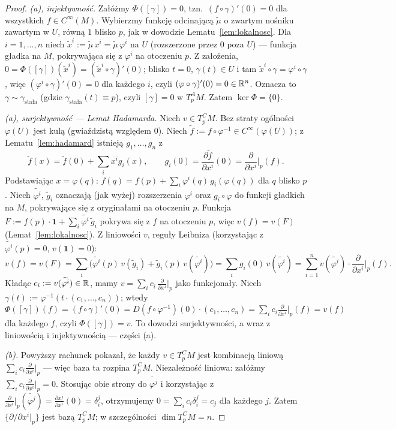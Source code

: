 \begin{proof}
\emph{(a), injektywność.} Załóżmy $\Phi([\gamma])=0$, tzn.\ $(f\circ\gamma)'(0)=0$ dla
wszystkich $f\in C^\infty(M)$. Wybierzmy funkcję odcinającą
$\tilde\mu$ o zwartym nośniku zawartym w $U$, równą $1$ blisko $p$,
jak w dowodzie Lematu~\ref{lem:lokalnosc}.
Dla $i=1,\dots,n$ niech $\tilde x^i:=\tilde\mu\,x^i
=\tilde\mu\,\varphi^i$ na $U$ (rozszerzone przez $0$ poza $U$) —
funkcja gładka na $M$, pokrywająca się z $\varphi^i$ na otoczeniu $p$. Z założenia,
$0=\Phi([\gamma])(\tilde x^i)=(\tilde x^i\circ\gamma)'(0)$; blisko $t=0$, $\gamma(t)\in U$
i tam $\tilde x^i\circ\gamma=\varphi^i\circ\gamma$, więc $(\varphi^i\circ\gamma)'(0)=0$ dla
każdego $i$, czyli $(\varphi\circ\gamma)'(0)=0\in\mathbb{R}^n$. Oznacza to $\gamma\sim
\gamma_{\text{stała}}$ (gdzie $\gamma_{\text{stała}}(t)\equiv p$), czyli $[\gamma]=0$ w
$T_p^AM$. Zatem $\ker\Phi=\{0\}$.

\emph{(a), surjektywność — Lemat Hadamarda.} Niech $v\in T_p^CM$. Bez straty ogólności
$\varphi(U)$ jest kulą (gwiaździstą względem $0$). Niech $\tilde f:=f\circ\varphi^{-1}\in
C^\infty(\varphi(U))$; z Lematu~\ref{lem:hadamard} istnieją $g_1,\dots,g_n$ z
\[
\tilde f(x)=\tilde f(0)+\sum_ix^ig_i(x), \qquad g_i(0)=\frac{\partial\tilde f}{\partial x^i}
(0)=\frac{\partial}{\partial x^i}\Big|_p(f).
\]
Podstawiając $x=\varphi(q)$: $f(q)=f(p)+\sum_i\varphi^i(q)\,g_i(\varphi(q))$ dla $q$
blisko $p$. Niech $\widetilde{\varphi^i}$, $\tilde g_i$ oznaczają (jak wyżej) rozszerzenia
$\varphi^i$ oraz $g_i\circ\varphi$ do funkcji gładkich na $M$, pokrywające się z
oryginałami na otoczeniu $p$. Funkcja $F:=f(p)\cdot\mathbf1+\sum_i\widetilde{\varphi^i}\,
\tilde g_i$ pokrywa się z $f$ na otoczeniu $p$, więc $v(f)=v(F)$ (Lemat~\ref{lem:lokalnosc}).
Z liniowości $v$, reguły Leibniza (korzystając z $\widetilde{\varphi^i}(p)=0$,
$v(\mathbf1)=0$):
\[
v(f)=v(F)=\sum_i\Big(\widetilde{\varphi^i}(p)\,v(\tilde g_i)+\tilde g_i(p)\,v
(\widetilde{\varphi^i})\Big)=\sum_ig_i(0)\,v(\widetilde{\varphi^i})=\sum_{i=1}^n
v(\widetilde{\varphi^i})\cdot\frac{\partial}{\partial x^i}\Big|_p(f).
\]
Kładąc $c_i:=v(\widetilde{\varphi^i})\in\mathbb{R}$, mamy $v=\sum_ic_i\,\frac{\partial}{\partial
x^i}\big|_p$ jako funkcjonały. Niech $\gamma(t):=\varphi^{-1}(t\cdot(c_1,\dots,c_n))$; wtedy
$\Phi([\gamma])(f)=(f\circ\gamma)'(0)=D(f\circ\varphi^{-1})(0)\cdot(c_1,\dots,c_n)=
\sum_ic_i\frac{\partial}{\partial x^i}\big|_p(f)=v(f)$ dla każdego $f$, czyli
$\Phi([\gamma])=v$. To dowodzi surjektywności, a wraz z liniowością i injektywnością —
części (a).

\emph{(b).} Powyższy rachunek pokazał, że każdy $v\in T_p^CM$ jest kombinacją liniową
$\sum_ic_i\frac{\partial}{\partial x^i}\big|_p$ — więc baza ta rozpina $T_p^CM$. Niezależność
liniowa: załóżmy $\sum_ic_i\frac{\partial}{\partial x^i}\big|_p=0$. Stosując obie strony
do $\widetilde{\varphi^j}$ i korzystając z $\frac{\partial}{\partial x^i}\big|_p
(\widetilde{\varphi^j})=\frac{\partial x^j}{\partial x^i}(0)=\delta_i^j$, otrzymujemy
$0=\sum_ic_i\delta_i^j=c_j$ dla każdego $j$. Zatem $\{\partial/\partial x^i|_p\}$ jest
bazą $T_p^CM$; w szczególności $\dim T_p^CM=n$.
\end{proof}


